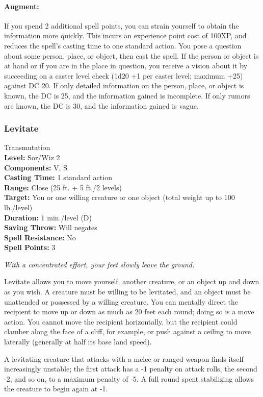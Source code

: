 \paragraph{Augment:} If you spend 2 additional spell points, you can strain yourself to obtain the information more quickly.
This incurs an experience point cost of 100XP, and reduces the spell's casting time to one standard action.
You pose a question about some person, place, or object, then cast the spell. 
If the person or object is at hand or if you are in the place in question, 
you receive a vision about it by succeeding on a caster level check (1d20 +1 per caster level; maximum +25) against DC 20. 
If only detailed information on the person, place, or object is known, the DC is 25, and the information gained is incomplete. 
If only rumors are known, the DC is 30, and the information gained is vague.
\subsubsection{Levitate}
\label{Spell:Levitate}
Transmutation
\\ \textbf{Level:} Sor/Wiz 2
\\ \textbf{Components:} V, S
\\ \textbf{Casting Time:} 1 standard action
\\ \textbf{Range:} Close (25 ft. + 5 ft./2 levels)
\\ \textbf{Target:} You or one willing creature or one object (total weight up to 100 lb./level)
\\ \textbf{Duration:} 1 min./level (D)
\\ \textbf{Saving Throw:} Will negates
\\ \textbf{Spell Resistance:} No
\\ \textbf{Spell Points:} 3

\emph{With a concentrated effort, your feet slowly leave the ground.}

Levitate allows you to move yourself, another creature, or an object up and down as you wish. 
A creature must be willing to be levitated, and an object must be unattended or possessed by a willing creature. 
You can mentally direct the recipient to move up or down as much as 20 feet each round; 
doing so is a move action. 
You cannot move the recipient horizontally, but the recipient could clamber along the face of a cliff, 
for example, or push against a ceiling to move laterally (generally at half its base land speed).

A levitating creature that attacks with a melee or ranged weapon finds itself increasingly unstable; 
the first attack has a -1 penalty on attack rolls, the second -2, and so on, to a maximum penalty of -5. 
A full round spent stabilizing allows the creature to begin again at -1.

